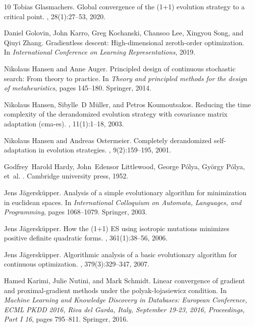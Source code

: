 \documentclass[journal]{IEEEtran}
\theoremstyle{definition}
\begin{document}
\begin{thebibliography}{10}
Tobias Glasmachers.
\newblock Global convergence of the {(1+1)} evolution strategy to a critical
  point.
, 28(1):27--53, 2020.

Daniel Golovin, John Karro, Greg Kochanski, Chansoo Lee, Xingyou Song, and
  Qiuyi Zhang.
\newblock Gradientless descent: High-dimensional zeroth-order optimization.
\newblock In {\em International Conference on Learning Representations}, 2019.

Nikolaus Hansen and Anne Auger.
\newblock Principled design of continuous stochastic search: From theory to
  practice.
\newblock In {\em Theory and principled methods for the design of
  metaheuristics}, pages 145--180. Springer, 2014.

Nikolaus Hansen, Sibylle~D M{\"u}ller, and Petros Koumoutsakos.
\newblock Reducing the time complexity of the derandomized evolution strategy
  with covariance matrix adaptation (cma-es).
, 11(1):1--18, 2003.

Nikolaus Hansen and Andreas Ostermeier.
\newblock Completely derandomized self-adaptation in evolution strategies.
, 9(2):159--195, 2001.

Godfrey~Harold Hardy, John~Edensor Littlewood, George P{\'o}lya, Gy{\"o}rgy
  P{\'o}lya, et~al.
.
\newblock Cambridge university press, 1952.

Jens J{\"a}gersk{\"u}pper.
\newblock Analysis of a simple evolutionary algorithm for minimization in
  euclidean spaces.
\newblock In {\em International Colloquium on Automata, Languages, and
  Programming}, pages 1068--1079. Springer, 2003.

Jens J{\"a}gersk{\"u}pper.
\newblock How the {(1+1) ES} using isotropic mutations minimizes positive
  definite quadratic forms.
, 361(1):38--56, 2006.

Jens J{\"a}gersk{\"u}pper.
\newblock Algorithmic analysis of a basic evolutionary algorithm for continuous
  optimization.
, 379(3):329--347, 2007.

Hamed Karimi, Julie Nutini, and Mark Schmidt.
\newblock Linear convergence of gradient and proximal-gradient methods under
  the polyak-{\l}ojasiewicz condition.
\newblock In {\em Machine Learning and Knowledge Discovery in Databases:
  European Conference, ECML PKDD 2016, Riva del Garda, Italy, September 19-23,
  2016, Proceedings, Part I 16}, pages 795--811. Springer, 2016.


\end{thebibliography}
\end{document}
